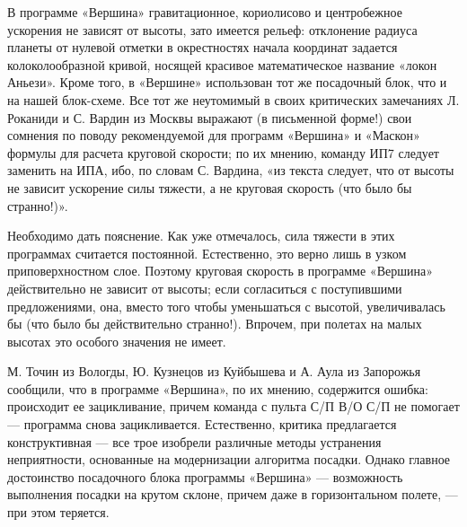 \documentclass[11pt,a4paper,oneside]{article}
\begin{document}
В программе «Вершина» гравитационное, кориолисово и центробежное ускорения не зависят от высоты, зато имеется рельеф: отклонение радиуса планеты от нулевой отметки в окрестностях начала координат задается колоколообразной кривой, носящей красивое математическое название «локон Аньези». Кроме того, в «Вершине» использован тот же посадочный блок, что и на нашей блок-схеме. Все тот же неутомимый в своих критических замечаниях Л. Роканиди и С. Вардин из Москвы выражают (в письменной форме!) свои сомнения по поводу рекомендуемой для программ «Вершина» и «Маскон» формулы для расчета круговой скорости; по их мнению, команду ИП7 следует заменить на ИПА, ибо, по словам С. Вардина, «из текста следует, что от высоты не зависит ускорение силы тяжести, а не круговая скорость (что было бы странно!)».

Необходимо дать пояснение. Как уже отмечалось, сила тяжести в этих программах считается постоянной. Естественно, это верно лишь в узком приповерхностном слое. Поэтому круговая скорость в программе «Вершина» действительно не зависит от высоты; если согласиться с поступившими предложениями, она, вместо того чтобы уменьшаться с высотой, увеличивалась бы (что было бы действительно странно!). Впрочем, при полетах на малых высотах это особого значения не имеет.

М. Точин из Вологды, Ю. Кузнецов из Куйбышева и А. Аула из Запорожья сообщили, что в программе «Вершина», по их мнению, содержится ошибка: происходит ее зацикливание, причем команда с пульта С/П В/О С/П не помогает — программа снова зацикливается. Естественно, критика предлагается конструктивная — все трое изобрели различные методы устранения неприятности, основанные на модернизации алгоритма посадки. Однако главное достоинство посадочного блока программы «Вершина» — возможность выполнения посадки на крутом склоне, причем даже в горизонтальном полете, — при этом теряется.
\end{document}
